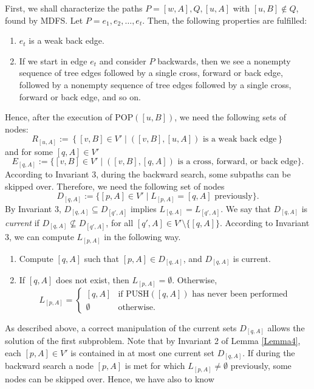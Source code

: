 \documentclass[12pt,twoside,a4paper]{article}
\begin{document}
First, we shall characterize the paths $P = [w,A],Q,[u,A]$ with $[u,B] \not\in
Q$, found by MDFS. Let $P = e_1,e_2, \ldots ,e_t$. Then, the following 
properties are fulfilled:
\begin{enumerate}
\item 
$e_t$ is a weak back edge.
\item
If we start in edge $e_t$ and consider $P$ backwards, then we see a nonempty sequence
of tree edges followed by a single cross, forward or back edge, followed by a 
nonempty sequence of tree edges followed by a single cross, forward or 
back edge, and so on.
\end{enumerate}
Hence, after the execution of POP$([u,B])$, we need the following sets
of nodes:
$$R_{[u,A]} := \left\{[v,B]\in V'\mid ([v,B],[u,A])
  \mbox{ is a weak back edge}\right\}$$
and for some $[q,A] \in V'$
$$
E_{[q,A]} := \{[v,B] \in V' \mid ([v,B],[q,A]) \mbox{ is a cross, forward,
              or back edge}\}.
$$
According to Invariant 3, during the backward search, some subpaths can be
skipped over. Therefore, we need the following set of nodes
$$\label{WM2}
D_{[q,A]} := \{[p,A] \in V' \mid L_{[p,A]} = [q,A] \mbox{ previously}\}.
$$
By Invariant 3, $D_{[q,A]} \subseteq D_{[q',A]}$ implies $L_{[q,A]} =
L_{[q',A]}$. 
We say that $D_{[q,A]}$ is {\em current\/} if $D_{[q,A]} \not\subseteq
D_{[q',A]}$, for all $[q',A] \in V'\setminus \{[q,A]\}$.
According to Invariant 3, we can compute $L_{[p,A]}$ in the following way.
\begin{enumerate}
\item Compute $[q,A]$ such that $[p,A] \in D_{[q,A]}$, and $D_{[q,A]}$ is 
current.
\item If $[q,A]$ does not exist, then $L_{[p,A]} = \emptyset$. Otherwise, 
$$L_{[p,A]} = \left\{ \begin{array}{ll}
                        [q,A] & \mbox{if PUSH$([q,A])$ has never been performed} \\
                        \emptyset & \mbox{otherwise.}
                      \end{array}
              \right.$$
\end{enumerate} 
As described above, a correct manipulation of the current sets $D_{[q,A]}$ 
allows the solution of the first subproblem. Note that by Invariant 2
of Lemma \ref{Lemma4}, each 
$[p,A] \in V'$ is contained in at most one current set $D_{[q,A]}$. 
If during the backward search a node $[p,A]$ is met for which $L_{[p,A]} \not= \emptyset$
previously, some nodes can be skipped over. Hence, we have also to know 
\end{document}
